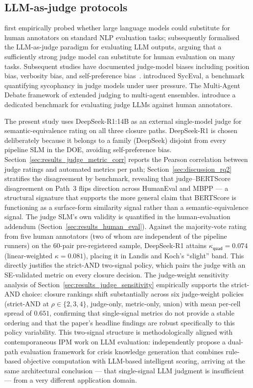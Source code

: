 \subsection{LLM-as-judge protocols}

\citet{Chiang2023LLMJudgeAlt} first empirically probed whether large language models could substitute for human annotators on standard NLP evaluation tasks; \citet{Zheng2023LLMJudge} subsequently formalised the LLM-as-judge paradigm for evaluating LLM outputs, arguing that a sufficiently strong judge model can substitute for human evaluation on many tasks. Subsequent studies have documented judge-model biases including position bias, verbosity bias, and self-preference bias~\citep{Panickssery2024JudgeBias, Wang2024JudgeBias}. \citet{Fanous2025SycEval} introduced SycEval, a benchmark quantifying sycophancy in judge models under user pressure. The Multi-Agent Debate framework of \citet{Du2023MAD} extended judging to multi-agent ensembles. \citet{Li2025JudgeBench} introduce a dedicated benchmark for evaluating judge LLMs against human annotators.

The present study uses DeepSeek-R1:14B as an external single-model judge for semantic-equivalence rating on all three closure paths. DeepSeek-R1 is chosen deliberately because it belongs to a family (DeepSeek) disjoint from every pipeline SLM in the DOE, avoiding self-preference bias. Section~\ref{sec:results_judge_metric_corr} reports the Pearson correlation between judge ratings and automated metrics per path; Section~\ref{sec:discussion_rq2} stratifies the disagreement by benchmark, revealing that judge--BERTScore disagreement on Path~3 flips direction across HumanEval and MBPP --- a structural signature that supports the more general claim that BERTScore is functioning as a surface-form similarity signal rather than a semantic-equivalence signal. The judge SLM's own validity is quantified in the human-evaluation addendum (Section~\ref{sec:results_human_eval}). Against the majority-vote rating from five human annotators (two of whom are independent of the pipeline runners) on the 60-pair pre-registered sample, DeepSeek-R1 attains $\kappa_{\textsf{quad}} = 0.074$ (linear-weighted $\kappa = 0.081$), placing it in Landis and Koch's ``slight'' band. This directly justifies the strict-AND two-signal policy, which pairs the judge with an SE-validated metric on every closure decision. The judge-weight sensitivity analysis of Section~\ref{sec:results_judge_sensitivity} empirically supports the strict-AND choice: closure rankings shift substantially across six judge-weight policies (strict-AND at $\rho \in \{2, 3, 4\}$, judge-only, metric-only, union) with mean per-cell spread of $0.651$, confirming that single-signal metrics do not provide a stable ordering and that the paper's headline findings are robust specifically to this policy variability. This two-signal structure is methodologically aligned with contemporaneous IPM work on LLM evaluation: \citet{Han2026CrisisKnowledge} independently propose a dual-path evaluation framework for crisis knowledge generation that combines rule-based objective computation with LLM-based intelligent scoring, arriving at the same architectural conclusion --- that single-signal LLM judgment is insufficient --- from a very different application domain.

